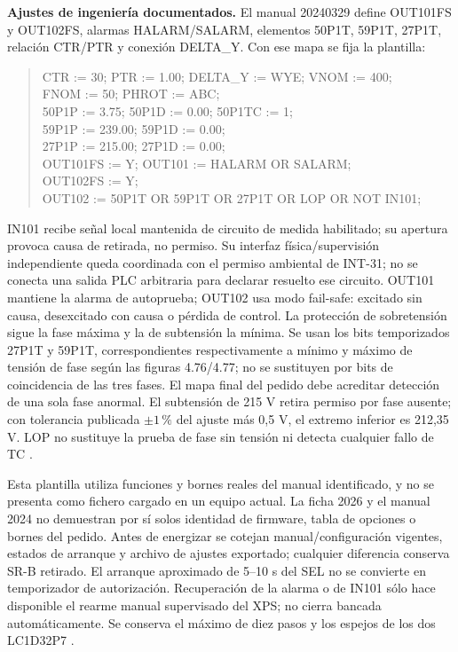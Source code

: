 \textbf{Ajustes de ingeniería documentados.} El manual 20240329 define OUT101FS y OUT102FS, alarmas HALARM/SALARM, elementos 50P1T, 59P1T, 27P1T, relación CTR/PTR y conexión DELTA\_Y. Con ese mapa se fija la plantilla:
\begin{quote}\ttfamily\small
CTR := 30; PTR := 1.00; DELTA\_Y := WYE; VNOM := 400;\\
FNOM := 50; PHROT := ABC;\\
50P1P := 3.75; 50P1D := 0.00; 50P1TC := 1;\\
59P1P := 239.00; 59P1D := 0.00;\\
27P1P := 215.00; 27P1D := 0.00;\\
OUT101FS := Y; OUT101 := HALARM OR SALARM;\\
OUT102FS := Y;\\
OUT102 := 50P1T OR 59P1T OR 27P1T OR LOP OR NOT IN101;
\end{quote}
IN101 recibe señal local mantenida de circuito de medida habilitado; su apertura provoca causa de retirada, no permiso. Su interfaz física/supervisión independiente queda coordinada con el permiso ambiental de INT-31; no se conecta una salida PLC arbitraria para declarar resuelto ese circuito. OUT101 mantiene la alarma de autoprueba; OUT102 usa modo fail-safe: excitado sin causa, desexcitado con causa o pérdida de control. La protección de sobretensión sigue la fase máxima y la de subtensión la mínima. Se usan los bits temporizados 27P1T y 59P1T, correspondientes respectivamente a mínimo y máximo de tensión de fase según las figuras 4.76/4.77; no se sustituyen por bits de coincidencia de las tres fases. El mapa final del pedido debe acreditar detección de una sola fase anormal. El subtensión de 215 V retira permiso por fase ausente; con tolerancia publicada $\pm1\,\%$ del ajuste más 0,5 V, el extremo inferior es 212,35 V. LOP no sustituye la prueba de fase sin tensión ni detecta cualquier fallo de TC \parencite[pp.~4.5--4.6, 4.15--4.16, 4.121--4.124, 4.145--4.146 y 4.200--4.201]{lote32-selmanual2024}.

Esta plantilla utiliza funciones y bornes reales del manual identificado, y no se presenta como fichero cargado en un equipo actual. La ficha 2026 y el manual 2024 no demuestran por sí solos identidad de firmware, tabla de opciones o bornes del pedido. Antes de energizar se cotejan manual/configuración vigentes, estados de arranque y archivo de ajustes exportado; cualquier diferencia conserva SR-B retirado. El arranque aproximado de 5--10 s del SEL no se convierte en temporizador de autorización. Recuperación de la alarma o de IN101 sólo hace disponible el rearme manual supervisado del XPS; no cierra bancada automáticamente. Se conserva el máximo de diez pasos y los espejos de los dos LC1D32P7 \parencites[p.~34]{lote29-sel751}[pp.~2.30 y 4.200--4.201]{lote32-selmanual2024}{lote29-selhealth}.

